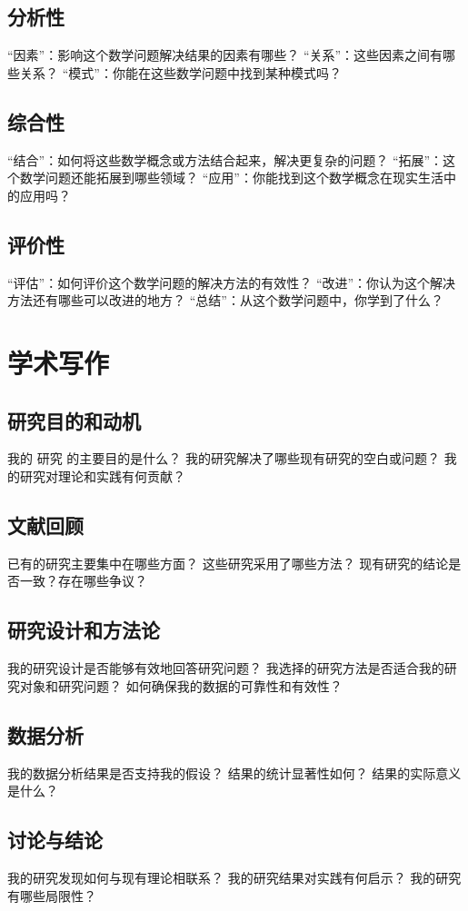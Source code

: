 \documentclass[12pt]{book}
\begin{document}
\subsection{分析性}
“因素”：影响这个数学问题解决结果的因素有哪些？
“关系”：这些因素之间有哪些关系？
“模式”：你能在这些数学问题中找到某种模式吗？

\subsection{综合性}
“结合”：如何将这些数学概念或方法结合起来，解决更复杂的问题？
“拓展”：这个数学问题还能拓展到哪些领域？
“应用”：你能找到这个数学概念在现实生活中的应用吗？

\subsection{评价性}
“评估”：如何评价这个数学问题的解决方法的有效性？
“改进”：你认为这个解决方法还有哪些可以改进的地方？
“总结”：从这个数学问题中，你学到了什么？

\section{学术写作}
\subsection{研究目的和动机}
我的 研究 的主要目的是什么？
我的研究解决了哪些现有研究的空白或问题？
我的研究对理论和实践有何贡献？

\subsection{文献回顾}
已有的研究主要集中在哪些方面？
这些研究采用了哪些方法？
现有研究的结论是否一致？存在哪些争议？

\subsection{研究设计和方法论}
我的研究设计是否能够有效地回答研究问题？
我选择的研究方法是否适合我的研究对象和研究问题？
如何确保我的数据的可靠性和有效性？

\subsection{数据分析}
我的数据分析结果是否支持我的假设？
结果的统计显著性如何？
结果的实际意义是什么？

\subsection{讨论与结论}
我的研究发现如何与现有理论相联系？
我的研究结果对实践有何启示？
我的研究有哪些局限性？
\end{document}
